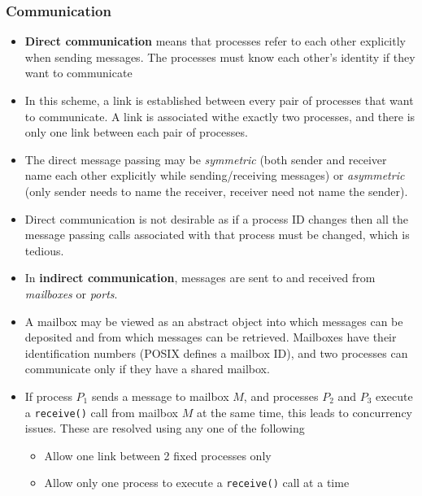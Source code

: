 \documentclass{article}
\theoremstyle{plain}
\theoremstyle{definition}
\begin{document}
\subsubsection{Communication}
\begin{itemize}
    \item \textbf{Direct communication} means that processes refer to each other explicitly when sending messages. The processes must know each other's identity if they want to communicate
    
    \item In this scheme, a link is established between every pair of processes that want to communicate. A link is associated withe exactly two processes, and there is only one link between each pair of processes.
    
    \item The direct message passing may be \textit{symmetric} (both sender and receiver name each other explicitly while sending/receiving messages) or \textit{asymmetric} (only sender needs to name the receiver, receiver need not name the sender).
    
    \item Direct communication is not desirable as if a process ID changes then all the message passing calls associated with that process must be changed, which is tedious. 
    
    \item In \textbf{indirect communication}, messages are sent to and received from \textit{mailboxes} or \textit{ports}. 
    
    \item A mailbox may be viewed as an abstract object into which messages can be deposited and from which messages can be retrieved. Mailboxes have their identification numbers (POSIX defines a mailbox ID), and two processes can communicate only if they have a shared mailbox. 
    
    \item If process $P_1$ sends a message to mailbox $M$, and processes $P_2$ and $P_3$ execute a \texttt{receive()} call from mailbox $M$ at the same time, this leads to concurrency issues. These are resolved using any one of the following
    \begin{itemize}
        \item Allow one link between 2 fixed processes only
        
        \item Allow only one process to execute a \texttt{receive()} call at a time
        

\end{itemize}
\end{itemize}
\end{document}
